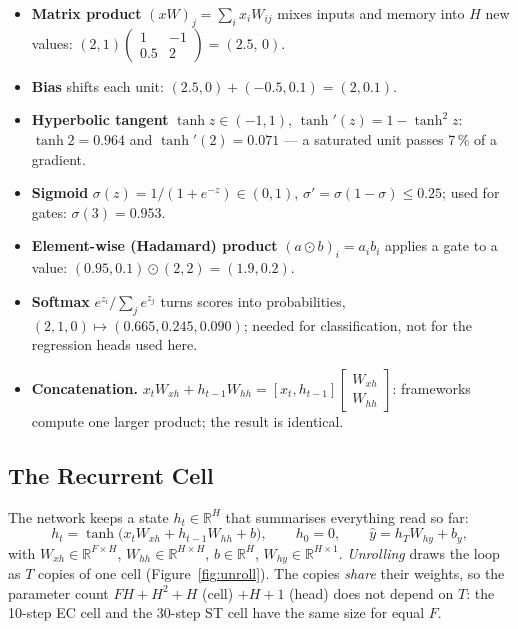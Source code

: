 \documentclass[11pt, a4paper]{article}
\begin{document}
\begin{itemize}
\item \textbf{Matrix product} $(xW)_j=\sum_ix_iW_{ij}$ mixes inputs and memory into $H$ new values: $(2,1)\begin{pmatrix}1&-1\\0.5&2\end{pmatrix}=(2.5,\,0)$.
\item \textbf{Bias} shifts each unit: $(2.5,0)+(-0.5,0.1)=(2,0.1)$.
\item \textbf{Hyperbolic tangent} $\tanh z\in(-1,1)$, $\tanh'(z)=1-\tanh^2 z$: $\tanh 2=0.964$ and $\tanh'(2)=0.071$ — a saturated unit passes 7\,\% of a gradient.
\item \textbf{Sigmoid} $\sigma(z)=1/(1+e^{-z})\in(0,1)$, $\sigma'=\sigma(1-\sigma)\le0.25$; used for gates: $\sigma(3)=0.953$.
\item \textbf{Element-wise (Hadamard) product} $(a\odot b)_i=a_ib_i$ applies a gate to a value: $(0.95,0.1)\odot(2,2)=(1.9,0.2)$.
\item \textbf{Softmax} $e^{z_i}/\sum_je^{z_j}$ turns scores into probabilities, $(2,1,0)\mapsto(0.665,0.245,0.090)$; needed for classification, not for the regression heads used here.
\item \textbf{Concatenation.} $x_tW_{xh}+h_{t-1}W_{hh}=[x_t,h_{t-1}]\begin{bmatrix}W_{xh}\\W_{hh}\end{bmatrix}$: frameworks compute one larger product; the result is identical.
\end{itemize}

\subsection{The Recurrent Cell}
\label{sec:cell}

The network keeps a state $h_t\in\mathbb{R}^H$ that summarises everything read so far:
\begin{equation}
h_t=\tanh\big(x_tW_{xh}+h_{t-1}W_{hh}+b\big),\qquad h_0=0,\qquad \hat y=h_TW_{hy}+b_y,
\label{eq:rnn}
\end{equation}
with $W_{xh}\in\mathbb{R}^{F\times H}$, $W_{hh}\in\mathbb{R}^{H\times H}$, $b\in\mathbb{R}^H$, $W_{hy}\in\mathbb{R}^{H\times1}$. \emph{Unrolling} draws the loop as $T$ copies of one cell
(Figure~\ref{fig:unroll}). The copies \emph{share} their weights, so the parameter count $FH+H^2+H$ (cell) $+H+1$ (head) does not depend on $T$: the 10-step EC cell
and the 30-step ST cell have the same size for equal $F$.
\end{document}

